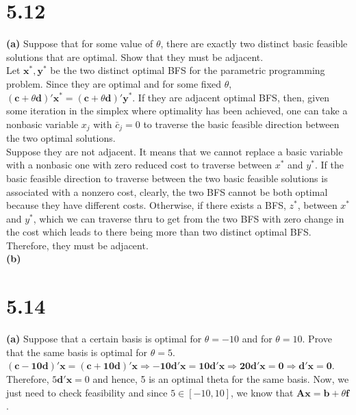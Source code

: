 \documentclass{article}
\begin{document}
\section*{5.12}
\textbf{(a)}  Suppose that for some value of $\theta$, there are exactly two distinct basic feasible solutions that are optimal.  Show that they must be adjacent.  \\

\noindent
Let $ \mathbf{x^*, y^*}$ be the two distinct optimal BFS for the parametric programming problem.  Since they are optimal and for some fixed $\theta$, $(\mathbf{c} + \theta \mathbf{d})\mathbf{' x^*} = (\mathbf{c} + \theta \mathbf{d})\mathbf{' y^*}$.  If they are adjacent optimal BFS, then, given some iteration in the simplex where optimality has been achieved, one can take a nonbasic variable $x_j$ with $\bar{c}_j = 0$ to traverse the basic feasible direction between the two optimal solutions.  \\

\noindent
Suppose they are not adjacent.  It means that we cannot replace a basic variable with a nonbasic one with zero reduced cost to traverse between $x^*$ and $y^*$.  If the basic feasible direction to traverse between the two basic feasible solutions is associated with a nonzero cost, clearly, the two BFS cannot be both optimal because they have different costs.  Otherwise,  if there exists a BFS, $z^*$, between $x^*$ and $y^*$, which we can traverse thru to get from the two BFS with zero change in the cost which leads to there being more than two distinct optimal BFS.  Therefore, they must be adjacent. \\

\noindent
\textbf{(b)}



\section*{5.14}
\textbf{(a)} Suppose that a certain basis is optimal for $\theta = -10$ and for $\theta = 10$.  Prove that the same basis is optimal for $\theta = 5$.  \\

\noindent
$\mathbf{(c - 10d)' x = (c + 10d)' x \Rightarrow -10d'x = 10d'x \Rightarrow 20d'x = 0 \Rightarrow d'x = 0}$.  Therefore, $5 \mathbf{d'x} = 0$ and hence, 5 is an optimal theta for the same basis.  Now, we just need to check feasibility and since $5 \in [-10, 10]$, we know that $\mathbf{Ax = b} + \theta \mathbf{f}$. \\
\end{document}
